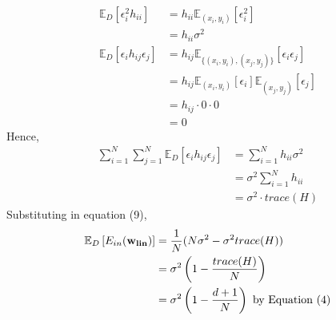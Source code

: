 \documentclass[12pt]{article}
\newcommand{\e}[0]{\epsilon}
\begin{document}
\begin{align*}
    \mathbb{E}_{D}\left[\e_i^2h_{ii} \right] & = h_{ii}\mathbb{E}_{(x_i,y_i)}\left[\e_i^2 \right]\\
    & = h_{ii}\sigma^2\\
    \mathbb{E}_{D}\left[\e_ih_{ij}\e_j \right] & = h_{ij}\mathbb{E}_{\{(x_i,y_i),(x_j,y_j)\}}\left[\e_i\e_j \right]\\
    & = h_{ij}\mathbb{E}_{(x_i,y_i)}\left[\e_i \right]\mathbb{E}_{(x_j,y_j)}\left[\e_j \right]\\
    & = h_{ij}\cdot 0\cdot 0\\
    & = 0
\end{align*}
Hence,
\begin{align}\nonumber
    \sum_{i = 1}^N\sum_{j=1}^N \mathbb{E}_{D}\left[\e_ih_{ij}\e_j \right] & = \sum_{i = 1}^N h_{ii}\sigma^2\\ \nonumber
    & = \sigma^2\sum_{i = 1}^N h_{ii}\\
    & = \sigma^2\cdot trace(H)
\end{align}
Substituting in equation (9),
\begin{align}\nonumber
    \mathbb{E}_{D}\left[ E_{in}({\bf w_{lin}})\right] & = \frac{1}{N} (N\sigma^2 - \sigma^2trace(H))\\ \nonumber
    & = \sigma^2 \left( 1 - \frac{trace(H)}{N}\right)\\
    & = \sigma^2 \left( 1 - \frac{d+1}{N}\right) \text{ by  Equation (4)}
\end{align}
\end{document}
